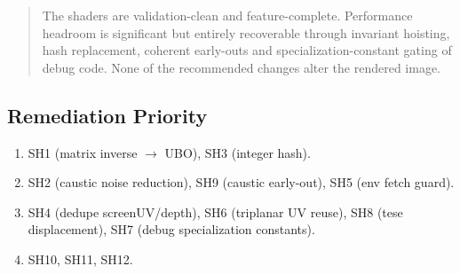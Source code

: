 \documentclass[a4paper,12pt]{article}
\newcommand{\severitybox}[2]{%
  \colorbox{#1}{\makebox[2.5cm][c]{\textcolor{white}{\textbf{#2}}}}%
}
\begin{document}
\medskip
\noindent\severitybox{mediumcolor}{OPTIMIZABLE}

\begin{quote}
  The shaders are validation-clean and feature-complete. Performance headroom is
  significant but entirely recoverable through invariant hoisting, hash
  replacement, coherent early-outs and specialization-constant gating of debug
  code. None of the recommended changes alter the rendered image.
\end{quote}

\subsection*{Remediation Priority}

\begin{enumerate}[noitemsep]
  \item[\textbf{P0}] SH1 (matrix inverse $\to$ UBO), SH3 (integer hash).
  \item[\textbf{P1}] SH2 (caustic noise reduction), SH9 (caustic early-out),
        SH5 (env fetch guard).
  \item[\textbf{P2}] SH4 (dedupe screenUV/depth), SH6 (triplanar UV reuse),
        SH8 (tese displacement), SH7 (debug specialization constants).
  \item[\textbf{P3}] SH10, SH11, SH12.
\end{enumerate}
\end{document}
